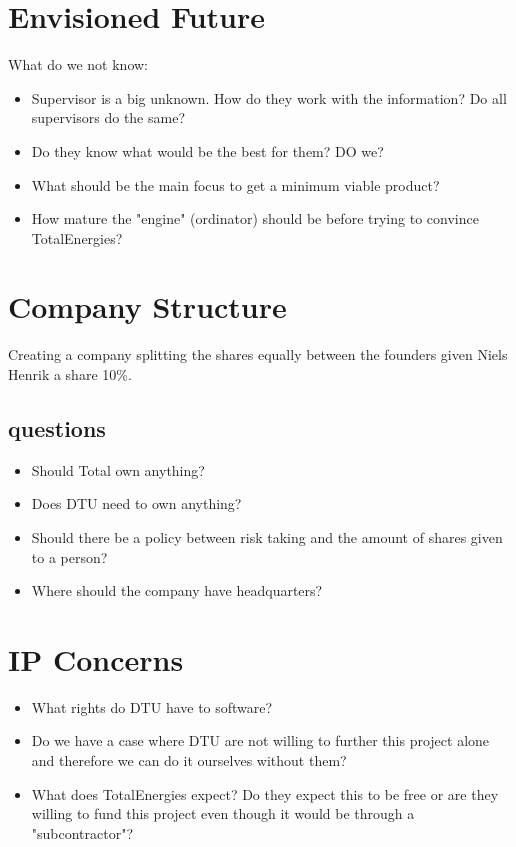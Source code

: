 \documentclass{article}
\begin{document}
\section{Envisioned Future}

What do we not know:
\begin{itemize}
    \item Supervisor is a big unknown. How do they work with the information? Do all supervisors do the same?
    \item Do they know what would be the best for them? DO we?
    \item What should be the main focus to get a minimum viable product?
    \item How mature the "engine" (ordinator) should be before trying to convince TotalEnergies?
\end{itemize}


\section{Company Structure}
Creating a company splitting the shares equally between the founders given Niels Henrik a share 10\%. 

\subsection{questions}
\begin{itemize}
    \item Should Total own anything?
    \item Does DTU need to own anything?
    \item Should there be a policy between risk taking and the amount of shares given to a person?
    \item Where should the company have headquarters?
\end{itemize}

\section{IP Concerns}
\begin{itemize}
    \item What rights do DTU have to software?
    \item Do we have a case where DTU are not willing to further this project alone and therefore we can do it ourselves without them?
    \item What does TotalEnergies expect? Do they expect this to be free or are they willing to fund this project even though it would be through a "subcontractor"?
\end{itemize}
\end{document}

